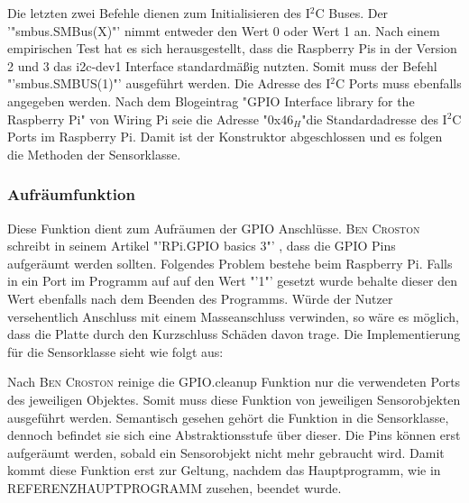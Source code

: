 	Die letzten zwei Befehle dienen zum Initialisieren des I$^2$C Buses. Der '"smbus.SMBus(X)"' nimmt entweder den Wert 0 oder Wert 1 an. Nach einem empirischen Test hat es sich herausgestellt, dass die Raspberry Pis in der Version 2 und 3 das i2c-dev1 Interface standardmäßig nutzten. Somit muss der Befehl "'smbus.SMBUS(1)"' ausgeführt werden. Die Adresse des I$^2$C Ports muss ebenfalls angegeben werden. Nach dem Blogeintrag "GPIO Interface library for the Raspberry Pi"\cite{I2CPCF8592:online} von Wiring Pi seie die Adresse "0x46$_H$"\space die Standardadresse des I$^2$C Ports im Raspberry Pi. Damit ist der Konstruktor abgeschlossen und es folgen die Methoden der Sensorklasse.
	
\subsubsection*{Aufräumfunktion}
	Diese Funktion dient zum Aufräumen der \ac{GPIO} Anschlüsse. \textsc{Ben Croston} schreibt in seinem Artikel "'RPi.GPIO basics 3"' \cite{RPiGPIOb90:online}, dass die \ac{GPIO} Pins aufgeräumt werden sollten. Folgendes Problem bestehe beim Raspberry Pi. Falls in ein Port im Programm auf auf den Wert "'1"' gesetzt wurde behalte dieser den Wert ebenfalls nach dem Beenden des Programms. Würde der Nutzer versehentlich Anschluss mit einem Masseanschluss verwinden, so wäre es möglich, dass die Platte durch den Kurzschluss Schäden davon trage. Die Implementierung für die Sensorklasse sieht wie folgt aus:
	
	Nach \textsc{Ben Croston} \cite{RPiGPIOb90:online} reinige die GPIO.cleanup Funktion nur die verwendeten Ports des jeweiligen Objektes. Somit muss diese Funktion von jeweiligen Sensorobjekten ausgeführt werden. Semantisch gesehen gehört die Funktion in die Sensorklasse, dennoch befindet sie sich eine Abstraktionsstufe über dieser. Die Pins können erst aufgeräumt werden, sobald ein Sensorobjekt nicht mehr gebraucht wird. Damit kommt diese Funktion erst zur Geltung, nachdem das Hauptprogramm, wie in REFERENZHAUPTPROGRAMM zusehen,
	beendet wurde.
